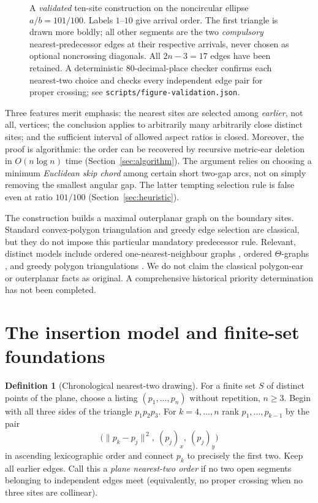 \documentclass[11pt,a4paper]{article}
\theoremstyle{definition}\newtheorem{definition}[theorem]{Definition}
\theoremstyle{remark}\newtheorem{remark}[theorem]{Remark}
\newcommand{\dist}[2]{\lVert #1-#2\rVert}
\begin{document}
\begin{figure}[H]
\centering
\caption{A \emph{validated} ten-site construction on the noncircular ellipse $a/b=101/100$. Labels $1$--$10$ give arrival order. The first triangle is drawn more boldly; all other segments are the two \emph{compulsory} nearest-predecessor edges at their respective arrivals, never chosen as optional noncrossing diagonals. All $2n-3=17$ edges have been retained. A deterministic 80-decimal-place checker confirms each nearest-two choice and checks every independent edge pair for proper crossing; see \texttt{scripts/figure-validation.json}.}\label{fig:headline}
\end{figure}

Three features merit emphasis: the nearest sites are selected among \emph{earlier}, not all, vertices; the conclusion applies to arbitrarily many arbitrarily close distinct sites; and the sufficient interval of allowed aspect ratios is closed. Moreover, the proof is algorithmic: the order can be recovered by recursive metric-ear deletion in $O(n\log n)$ time (Section~\ref{sec:algorithm}). The argument relies on choosing a minimum \emph{Euclidean skip chord} among certain short two-gap arcs, not on simply removing the smallest angular gap. The latter tempting selection rule is false even at ratio $101/100$ (Section~\ref{sec:heuristic}).

The construction builds a maximal outerplanar graph on the boundary sites. Standard convex-polygon triangulation and greedy edge selection are classical, but they do not impose this particular mandatory predecessor rule. Relevant, distinct models include ordered one-nearest-neighbour graphs \citep{agoston2026}, ordered $\Theta$-graphs \citep{bose2004}, and greedy polygon triangulations \citep{levcopoulos1987,finlayson1992}. We do not claim the classical polygon-ear or outerplanar facts as original. A comprehensive historical priority determination has not been completed.

\section{The insertion model and finite-set foundations}\label{sec:model}
\begin{definition}[Chronological nearest-two drawing]\label{def:grow}
For a finite set $S$ of distinct points of the plane, choose a listing $(p_1,\dots,p_n)$ without repetition, $n\ge3$. Begin with all three sides of the triangle $p_1p_2p_3$. For $k=4,\dots,n$ rank $p_1,\dots,p_{k-1}$ by the pair
\[
 \bigl(\dist{p_k}{p_j}^{\,2},\ (p_j)_x,\ (p_j)_y\bigr)
\]
in ascending lexicographic order and connect $p_k$ to precisely the first two. Keep all earlier edges. Call this a \emph{plane nearest-two order} if no two open segments belonging to independent edges meet (equivalently, no proper crossing when no three sites are collinear).
\end{definition}
\end{document}

